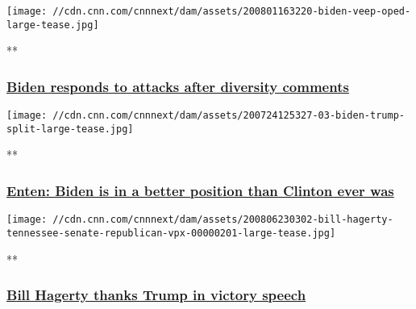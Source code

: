 \href{/videos/politics/2020/08/07/biden-diversity-comments-african-american-communities-saenz-nr-vpx.cnn/video/playlists/this-week-in-politics/}{}

\texttt{[image: //cdn.cnn.com/cnnnext/dam/assets/200801163220-biden-veep-oped-large-tease.jpg]}

**

\hypertarget{biden-responds-to-attacks-after-diversity-comments}{%
\subsubsection{\texorpdfstring{\href{/videos/politics/2020/08/07/biden-diversity-comments-african-american-communities-saenz-nr-vpx.cnn/video/playlists/this-week-in-politics/}{Biden
responds to attacks after diversity
comments}}{Biden responds to attacks after diversity comments}}\label{biden-responds-to-attacks-after-diversity-comments}}

\href{/videos/politics/2020/08/07/biden-ahead-trump-2020-presidential-election-enten-newday-vpx.cnn/video/playlists/this-week-in-politics/}{}

\texttt{[image: //cdn.cnn.com/cnnnext/dam/assets/200724125327-03-biden-trump-split-large-tease.jpg]}

**

\hypertarget{enten-biden-is-in-a-better-position-than-clinton-ever-was}{%
\subsubsection{\texorpdfstring{\href{/videos/politics/2020/08/07/biden-ahead-trump-2020-presidential-election-enten-newday-vpx.cnn/video/playlists/this-week-in-politics/}{Enten:
Biden is in a better position than Clinton ever
was}}{Enten: Biden is in a better position than Clinton ever was}}\label{enten-biden-is-in-a-better-position-than-clinton-ever-was}}

\href{/videos/politics/2020/08/07/bill-hagerty-tennessee-senate-republican-vpx.wztv/video/playlists/this-week-in-politics/}{}

\texttt{[image: //cdn.cnn.com/cnnnext/dam/assets/200806230302-bill-hagerty-tennessee-senate-republican-vpx-00000201-large-tease.jpg]}

**

\hypertarget{bill-hagerty-thanks-trump-in-victory-speech}{%
\subsubsection{\texorpdfstring{\href{/videos/politics/2020/08/07/bill-hagerty-tennessee-senate-republican-vpx.wztv/video/playlists/this-week-in-politics/}{Bill
Hagerty thanks Trump in victory
speech}}{Bill Hagerty thanks Trump in victory speech}}\label{bill-hagerty-thanks-trump-in-victory-speech}}

